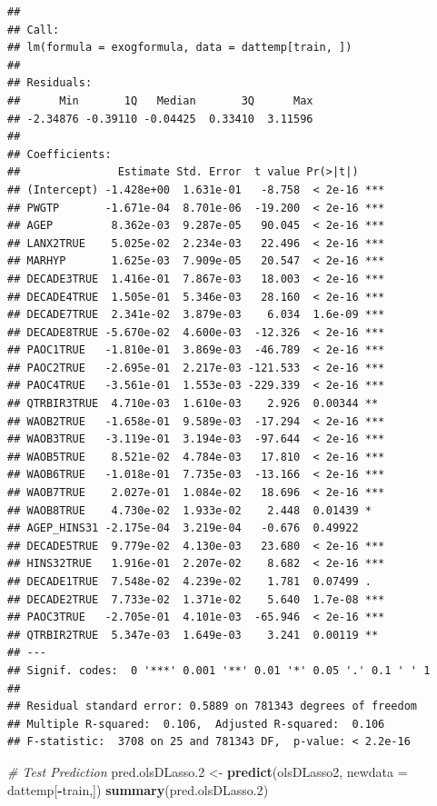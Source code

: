 \documentclass[
]{article}
\newenvironment{Shaded}{\begin{snugshade}}{\end{snugshade}}
\newcommand{\CommentTok}[1]{\textcolor[rgb]{0.56,0.35,0.01}{\textit{#1}}}
\newcommand{\DataTypeTok}[1]{\textcolor[rgb]{0.13,0.29,0.53}{#1}}
\newcommand{\FloatTok}[1]{\textcolor[rgb]{0.00,0.00,0.81}{#1}}
\newcommand{\KeywordTok}[1]{\textcolor[rgb]{0.13,0.29,0.53}{\textbf{#1}}}
\newcommand{\NormalTok}[1]{#1}
\newcommand{\OperatorTok}[1]{\textcolor[rgb]{0.81,0.36,0.00}{\textbf{#1}}}
\newcommand{\StringTok}[1]{\textcolor[rgb]{0.31,0.60,0.02}{#1}}
\begin{document}
\begin{verbatim}
## 
## Call:
## lm(formula = exogformula, data = dattemp[train, ])
## 
## Residuals:
##      Min       1Q   Median       3Q      Max 
## -2.34876 -0.39110 -0.04425  0.33410  3.11596 
## 
## Coefficients:
##               Estimate Std. Error  t value Pr(>|t|)    
## (Intercept) -1.428e+00  1.631e-01   -8.758  < 2e-16 ***
## PWGTP       -1.671e-04  8.701e-06  -19.200  < 2e-16 ***
## AGEP         8.362e-03  9.287e-05   90.045  < 2e-16 ***
## LANX2TRUE    5.025e-02  2.234e-03   22.496  < 2e-16 ***
## MARHYP       1.625e-03  7.909e-05   20.547  < 2e-16 ***
## DECADE3TRUE  1.416e-01  7.867e-03   18.003  < 2e-16 ***
## DECADE4TRUE  1.505e-01  5.346e-03   28.160  < 2e-16 ***
## DECADE7TRUE  2.341e-02  3.879e-03    6.034  1.6e-09 ***
## DECADE8TRUE -5.670e-02  4.600e-03  -12.326  < 2e-16 ***
## PAOC1TRUE   -1.810e-01  3.869e-03  -46.789  < 2e-16 ***
## PAOC2TRUE   -2.695e-01  2.217e-03 -121.533  < 2e-16 ***
## PAOC4TRUE   -3.561e-01  1.553e-03 -229.339  < 2e-16 ***
## QTRBIR3TRUE  4.710e-03  1.610e-03    2.926  0.00344 ** 
## WAOB2TRUE   -1.658e-01  9.589e-03  -17.294  < 2e-16 ***
## WAOB3TRUE   -3.119e-01  3.194e-03  -97.644  < 2e-16 ***
## WAOB5TRUE    8.521e-02  4.784e-03   17.810  < 2e-16 ***
## WAOB6TRUE   -1.018e-01  7.735e-03  -13.166  < 2e-16 ***
## WAOB7TRUE    2.027e-01  1.084e-02   18.696  < 2e-16 ***
## WAOB8TRUE    4.730e-02  1.933e-02    2.448  0.01439 *  
## AGEP_HINS31 -2.175e-04  3.219e-04   -0.676  0.49922    
## DECADE5TRUE  9.779e-02  4.130e-03   23.680  < 2e-16 ***
## HINS32TRUE   1.916e-01  2.207e-02    8.682  < 2e-16 ***
## DECADE1TRUE  7.548e-02  4.239e-02    1.781  0.07499 .  
## DECADE2TRUE  7.733e-02  1.371e-02    5.640  1.7e-08 ***
## PAOC3TRUE   -2.705e-01  4.101e-03  -65.946  < 2e-16 ***
## QTRBIR2TRUE  5.347e-03  1.649e-03    3.241  0.00119 ** 
## ---
## Signif. codes:  0 '***' 0.001 '**' 0.01 '*' 0.05 '.' 0.1 ' ' 1
## 
## Residual standard error: 0.5889 on 781343 degrees of freedom
## Multiple R-squared:  0.106,  Adjusted R-squared:  0.106 
## F-statistic:  3708 on 25 and 781343 DF,  p-value: < 2.2e-16
\end{verbatim}

\begin{Shaded}
\begin{Highlighting}[]
\CommentTok{# Test Prediction}
\NormalTok{pred.olsDLasso}\FloatTok{.2}\NormalTok{ <-}\StringTok{ }\KeywordTok{predict}\NormalTok{(olsDLasso2, }\DataTypeTok{newdata =}\NormalTok{ dattemp[}\OperatorTok{-}\NormalTok{train,])}
\KeywordTok{summary}\NormalTok{(pred.olsDLasso}\FloatTok{.2}\NormalTok{)}
\end{Highlighting}
\end{Shaded}
\end{document}
